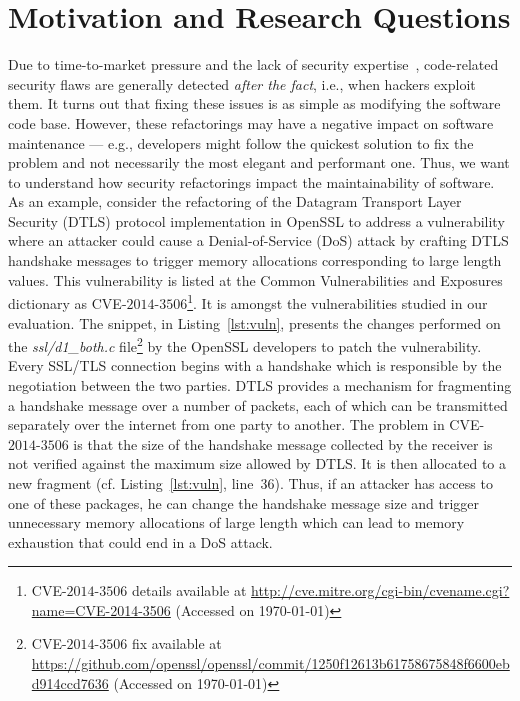 \documentclass[sigconf,review]{acmart}
\makeatletter
\newcounter{lstannotation}
\newcommand\footnoteref[1]{\protected@xdef\@thefnmark{\ref{#1}}\@footnotemark}
\makeatother
\begin{document}
\section{Motivation and Research Questions}\label{sec:motivation}
%
Due to time-to-market pressure and the lack of security expertise~\cite{8077802}, code-related
security flaws are generally detected \textit{after the fact}, i.e., when
hackers exploit them. It turns out that fixing these issues is as simple as
modifying the software code base. However, these refactorings may have a
negative impact on software maintenance --- e.g., developers might follow the
quickest solution to fix the problem and not necessarily the most elegant and
performant one. Thus, we want to understand how security refactorings impact
the maintainability of software. 
As an example, consider the refactoring of the Datagram Transport Layer Security
(DTLS) protocol implementation in OpenSSL\footnoteref{openssl} to address a vulnerability where an attacker could cause a Denial-of-Service
(DoS) attack by crafting DTLS handshake messages to trigger memory allocations
corresponding to large length values. This vulnerability is listed at the Common
Vulnerabilities and Exposures dictionary as CVE-$2014$-$3506$\footnote{CVE-$2014$-$3506$
details available at \url{http://cve.mitre.org/cgi-bin/cvename.cgi?name=CVE-2014-3506}
(Accessed on \today{})}. It is amongst the vulnerabilities studied in our
evaluation. The snippet, in Listing~\ref{lst:vuln}, presents the changes performed on the
\emph{ssl/d1\_both.c} file\footnote{CVE-$2014$-$3506$ fix available  at
\url{https://github.com/openssl/openssl/commit/1250f12613b61758675848f6600ebd914ccd7636}
(Accessed on \today{})} by the OpenSSL developers to patch the vulnerability. Every SSL/TLS connection begins with a handshake which is responsible by the
negotiation between the two parties. DTLS provides a mechanism for fragmenting
a handshake message over a number of packets, each of which can be transmitted
separately over the internet from one party to another. The problem in
CVE-$2014$-$3506$ is that the size of the handshake message collected by the
receiver is not verified against the maximum size allowed by DTLS. It is then
allocated to a new fragment (cf. Listing~\ref{lst:vuln}, line~36). Thus, if an
attacker has access to one of these packages, he can change the
handshake message size and trigger unnecessary memory allocations of large
length which can lead to memory exhaustion that could end in a DoS attack.
\medskip
\setcounter{lstannotation}{0}
\end{document}
